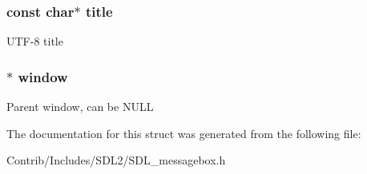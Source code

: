 \subsubsection[{\texorpdfstring{title}{title}}]{\setlength{\rightskip}{0pt plus 5cm}const char$\ast$ title}\hypertarget{struct_s_d_l___message_box_data_a8214780964530800368b406c681fd1d9}{}\label{struct_s_d_l___message_box_data_a8214780964530800368b406c681fd1d9}
U\+T\+F-\/8 title 
\subsubsection[{\texorpdfstring{window}{window}}]{$\ast$ window}\hypertarget{struct_s_d_l___message_box_data_aaa8e409e04dcf575ef63fd5fb3db06f9}{}\label{struct_s_d_l___message_box_data_aaa8e409e04dcf575ef63fd5fb3db06f9}
Parent window, can be N\+U\+LL 

The documentation for this struct was generated from the following file\+:\begin{DoxyCompactItemize}
\item 
Contrib/\+Includes/\+S\+D\+L2/S\+D\+L\+\_\+messagebox.\+h\end{DoxyCompactItemize}
